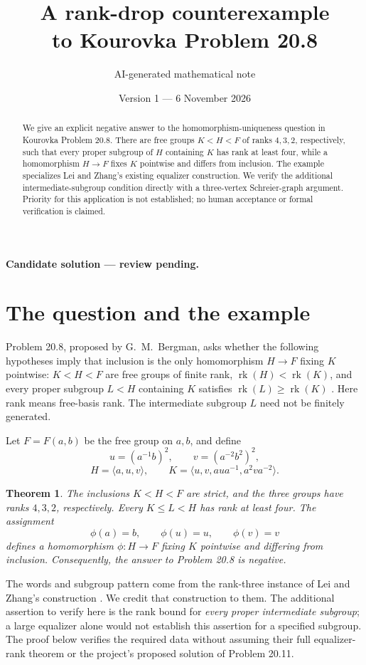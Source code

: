 \documentclass[11pt,a4paper]{article}
\title{A rank-drop counterexample\protect\\ to Kourovka Problem 20.8}
\author{AI-generated mathematical note}
\date{Version 1 --- 6 November 2026}
\newtheorem{theorem}{Theorem}
\newcommand{\rk}{\operatorname{rk}}
\newcommand{\gen}[1]{\langle #1\rangle}
\begin{document}
\maketitle
\begin{center}\small\textbf{Candidate solution --- review pending.}\end{center}
\begin{abstract}
We give an explicit negative answer to the homomorphism-uniqueness question in Kourovka Problem 20.8. There are free groups $K<H<F$ of ranks $4,3,2$, respectively, such that every proper subgroup of $H$ containing $K$ has rank at least four, while a homomorphism $H\to F$ fixes $K$ pointwise and differs from inclusion. The example specializes Lei and Zhang's existing equalizer construction. We verify the additional intermediate-subgroup condition directly with a three-vertex Schreier-graph argument. Priority for this application is not established; no human acceptance or formal verification is claimed.
\end{abstract}

\section{The question and the example}
Problem 20.8, proposed by G.~M.~Bergman, asks whether the following hypotheses imply that inclusion is the only homomorphism $H\to F$ fixing $K$ pointwise: $K<H<F$ are free groups of finite rank, $\rk(H)<\rk(K)$, and every proper subgroup $L<H$ containing $K$ satisfies $\rk(L)\geq\rk(K)$ \cite{Kourovka}. Here rank means free-basis rank. The intermediate subgroup $L$ need not be finitely generated.

Let $F=F(a,b)$ be the free group on $a,b$, and define
\[
u=(a^{-1}b)^2,\qquad v=(a^{-2}b^2)^2,
\]
\[
H=\gen{a,u,v},\qquad K=\gen{u,v,aua^{-1},a^2va^{-2}}.
\]
\begin{theorem}\label{thm:main}
The inclusions $K<H<F$ are strict, and the three groups have ranks $4,3,2$, respectively. Every $K\leq L<H$ has rank at least four. The assignment
\[
\phi(a)=b,\qquad \phi(u)=u,\qquad \phi(v)=v
\]
defines a homomorphism $\phi:H\to F$ fixing $K$ pointwise and differing from inclusion. Consequently, the answer to Problem 20.8 is negative.
\end{theorem}

The words and subgroup pattern come from the rank-three instance of Lei and Zhang's construction \cite[Proposition 3.3 and Construction 4.1]{LZ}. We credit that construction to them. The additional assertion to verify here is the rank bound for \emph{every proper intermediate subgroup}; a large equalizer alone would not establish this assertion for a specified subgroup. The proof below verifies the required data without assuming their full equalizer-rank theorem or the project's proposed solution of Problem 20.11.
\end{document}
